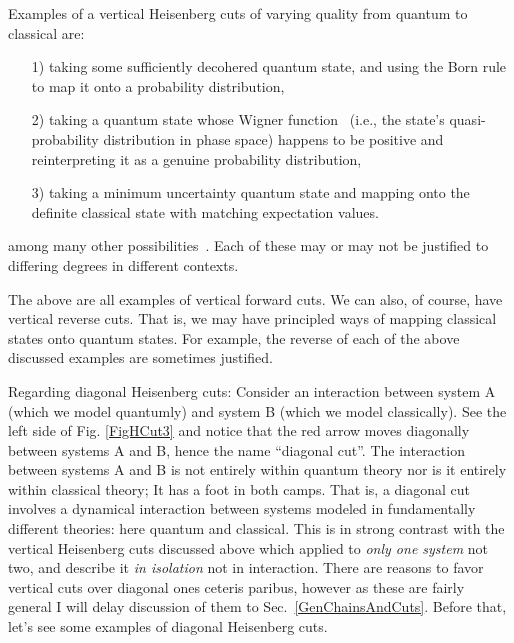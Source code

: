 \documentclass[prd,twocolumn,superscriptaddress,floatfix,amsmath,amssymb,amsfonts,nofootinbib]{revtex4-2}
\begin{document}
Examples of a vertical Heisenberg cuts of varying quality from quantum to classical are:
\begin{enumerate}
    \item[1)] taking some sufficiently decohered quantum state, and using the Born rule to map it onto a probability distribution,
    \item[2)] taking a quantum state whose Wigner function~\cite{QMPhaseSpace} (i.e., the state's quasi-probability distribution in phase space) happens to be positive and reinterpreting it as a genuine probability distribution,
    \item[3)] taking a minimum uncertainty quantum state and mapping onto the definite classical state with matching expectation values.
\end{enumerate}
among many other possibilities~\cite{Rosaler}. Each of these may or may not be justified to differing degrees in different contexts. 

The above are all examples of vertical forward cuts. We can also, of course, have vertical reverse cuts. That is, we may have principled ways of mapping classical states onto quantum states. For example, the reverse of each of the above discussed examples are sometimes justified.

Regarding diagonal Heisenberg cuts: Consider an interaction between system A (which we model quantumly) and system B (which we model classically). See the left side of Fig. \ref{FigHCut3} and notice that the red arrow moves diagonally between systems A and B, hence the name ``diagonal cut''. The interaction between systems A and B is not entirely within quantum theory nor is it entirely within classical theory; It has a foot in both camps. That is, a diagonal cut involves a dynamical interaction between systems modeled in fundamentally different theories: here quantum and classical. This is in strong contrast with the vertical Heisenberg cuts discussed above which applied to \textit{only one system} not two, and describe it \textit{in isolation} not in interaction. There are reasons to favor vertical cuts over diagonal ones ceteris paribus, however as these are fairly general I will delay discussion of them to Sec.~\ref{GenChainsAndCuts}. Before that, let's see some examples of diagonal Heisenberg cuts. 
\end{document}
